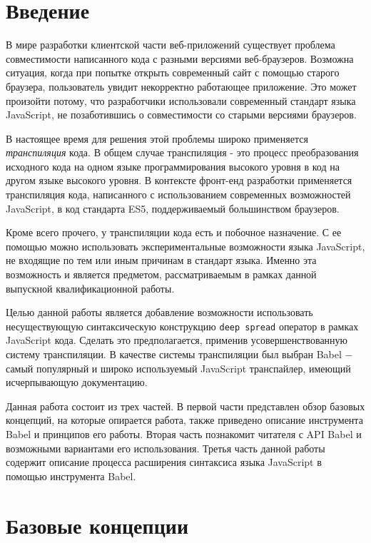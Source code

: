 \documentclass[14pt, a4paper]{article}
\def\code#1{\texttt{#1}} %
\begin{document}

\tableofcontents
\pagebreak

\section*{Введение}

В мире разработки клиентской части веб-приложений существует проблема совместимости написанного кода
с разными версиями веб-браузеров. Возможна ситуация, когда при попытке открыть современный сайт с
помощью старого браузера, пользователь увидит некорректно работающее приложение. Это может произойти
потому, что разработчики использовали современный стандарт языка JavaScript, не позаботившись о
совместимости со старыми версиями браузеров.

В настоящее время для решения этой проблемы широко применяется \textit{транспиляция} кода. В общем случае
транспиляция - это процесс преобразования исходного кода на одном языке программирования высокого
уровня в код на другом языке высокого уровня. В контексте фронт-енд разработки применяется
транспиляция кода, написанного с использованием современных возможностей JavaScript, в код стандарта
ES5, поддерживаемый большинством браузеров.

Кроме всего прочего, у транспиляции кода есть и побочное назначение. С ее помощью можно использовать
экспериментальные возможности языка JavaScript, не входящие по тем или иным причинам в стандарт языка.
Именно эта возможность и является предметом, рассматриваемым в рамках данной выпускной квалификационной работы.

Целью данной работы является добавление возможности использовать несуществующую синтаксическую
конструкцию \code{deep spread} оператор в рамках JavaScript кода. Сделать это предполагается,
применив усовершенствованную систему транспиляции. В качестве системы транспиляции был выбран Babel
$-$  самый популярный и широко используемый JavaScript транспайлер, имеющий исчерпывающую документацию.

Данная работа состоит из трех частей. В первой части представлен обзор базовых концепций,
на которые опирается работа, также приведено описание инструмента Babel и принципов его работы.
Вторая часть познакомит читателя с API Babel и возможными вариантами его использования. Третья часть
данной работы содержит описание процесса расширения синтаксиса языка JavaScript в помощью инструмента Babel.

\pagebreak
\section{Базовые концепции}
\end{document}
